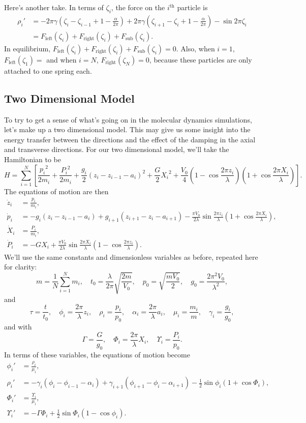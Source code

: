\documentclass[11pt]{article}
\begin{document}
Here's another take. In terms of $\zeta_i$, the force on the $i^\text{th}$ particle is
\begin{align*}
\rho_i'
	&=-2\pi\gamma\left(\zeta_i-\zeta_{i-1}+1-\frac{\alpha}{2\pi}\right)
		+2\pi\gamma\left(\zeta_{i+1}-\zeta_i+1-\frac{\alpha}{2\pi}\right)
		-\sin2\pi\zeta_i\\
	&=F_\text{left}(\zeta_i)+F_\text{right}(\zeta_i)
		+F_\text{sub}(\zeta_i).
\end{align*}
In equilibrium, $F_\text{left}(\zeta_i)+F_\text{right}(\zeta_i)+F_\text{sub}(\zeta_i)=0$. Also, when $i=1$, $F_\text{left}(\zeta_1)=$ and when $i=N$, $F_\text{right}(\zeta_N)=0$, because these particles are only attached to one spring each.

\subsection{Two Dimensional Model}

To try to get a sense of what's going on in the molecular dynamics simulations, let's make up a two dimensional model. This may give us some insight into the energy transfer between the directions and the effect of the damping in the axial and transverse directions. For our two dimensional model, we'll take the Hamiltonian to be
\[
H=\sum_{i=1}^N\left[\frac{{p_i}^2}{2m_i}+\frac{{P_i}^2}{2m_i}
	+\frac{g_i}{2}\left(z_i-z_{i-1}-a_i\right)^2
	+\frac{G}{2}{X_i}^2
	+\frac{V_0}{4}\left(1-\cos\frac{2\pi z_i}{\lambda}\right)
		\left(1+\cos\frac{2\pi X_i}{\lambda}\right)\right].
\]
The equations of motion are then
\begin{align*}
\dot{z}_i&=\frac{p_i}{m_i},\\
\dot{p}_i&=-g_i(z_i-z_{i-1}-a_i)
	+g_{i+1}(z_{i+1}-z_i-a_{i+1})
	-\frac{\pi V_0}{2\lambda}\sin\frac{2\pi z_i}{\lambda}
		\left(1+\cos\frac{2\pi X_i}{\lambda}\right),\\
\dot{X}_i&=\frac{P_i}{m_i},\\
\dot{P}_i&=-GX_i+\frac{\pi V_0}{2\lambda}\sin\frac{2\pi X_i}{\lambda}
		\left(1-\cos\frac{2\pi z_i}{\lambda}\right).
\end{align*}
We'll use the same constants and dimensionless variables as before, repeated here for clarity:
\[
m=\frac{1}{N}\sum_{i=1}^N m_i,\quad
t_0 = \frac{\lambda}{2\pi}\sqrt{\frac{2m}{V_0}},\quad
p_0 = \sqrt{\frac{mV_0}{2}},\quad
g_0 = \frac{2\pi^2V_0}{\lambda^2},
\]
and
\[
\tau=\frac{t}{t_0},\quad
\phi_i=\frac{2\pi}{\lambda} z_i,\quad
\rho_i=\frac{p_i}{p_0},\quad
\alpha_i=\frac{2\pi}{\lambda} a_i,\quad
\mu_i=\frac{m_i}{m},\quad
\gamma_i=\frac{g_i}{g_0},
\]
and with
\[
\Gamma=\frac{G}{g_0},\quad
\Phi_i=\frac{2\pi}{\lambda}X_i,\quad
\Upsilon_i=\frac{P_i}{p_0}.
\]
In terms of these variables, the equations of motion become
\begin{align*}
\phi_i'&=\frac{\rho_i}{\mu_i},\\
\rho_i'&=-\gamma_i(\phi_i-\phi_{i-1}-\alpha_i)
	+\gamma_{i+1}(\phi_{i+1}-\phi_i-\alpha_{i+1})
	-\frac{1}{2}\sin\phi_i\left(1+\cos\Phi_i\right),\\
\Phi_i'&=\frac{\Upsilon_i}{\mu_i},\\
\Upsilon_i'&=-\Gamma\Phi_i
	+\frac{1}{2}\sin\Phi_i\left(1-\cos\phi_i\right).
\end{align*}
\end{document}
